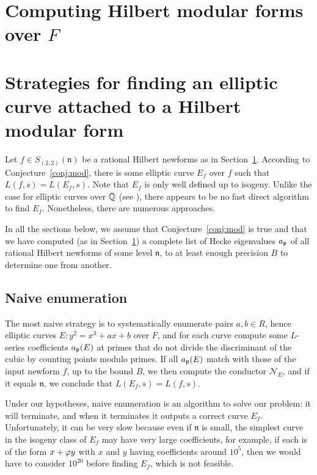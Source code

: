 \documentclass{article}
\newcommand{\n}{\mathfrak{n}}
\newcommand{\cN}{\mathcal{N}}
\begin{document}
\section{Computing Hilbert modular forms over $F$}\label{sec:hmf}



\section{Strategies for finding an elliptic curve attached to a Hilbert modular form}
Let $f\in S_{(2,2)}(\n)$ be a rational Hilbert newforms as in
Section~\ref{sec:hmf}.  According to Conjecture~\ref{conj:mod}, there
is some elliptic curve $E_f$ over $f$ such that $L(f,s) = L(E_f,s)$.
Note that $E_f$ is only well defined up to isogeny.  Unlike the case
for elliptic curves over $\mathbb{Q}$ (see \cite{cremona:algs}), there appears
to be no fast direct algorithm to find $E_f$.  Nonetheless, there are
numerous approaches.

In all the sections below, we assume that Conjecture~\ref{conj:mod} is
true and that we have computed (as in Section~\ref{sec:hmf}) a
complete list of Hecke eigenvalues $a_{\mathfrak{p}}$ of all rational Hilbert
newforms of some level $\n$, to at least enough precision $B$ to determine
one from another.

\subsection{Naive enumeration}\label{sec:naive}

The most naive strategy is to systematically enumerate pairs $a,b\in
R$, hence elliptic curves $E: y^2 = x^3 + ax + b$ over $F$, and for
each curve compute some $L$-series coefficients $a_{\mathfrak{p}}(E)$ at primes
that do not divide the discriminant of the cubic by counting points
modulo primes.  If all $a_{\mathfrak{p}}(E)$ match with those of the input newform
$f$, up to the bound $B$, we then compute the conductor $\cN_E$, and
if it equals $\n$, we conclude that $L(E_f,s) = L(f,s)$.

Under our hypotheses, naive enumeration is an algorithm to solve our
problem: it will terminate, and when it terminates it outputs a
correct curve $E_f$. Unfortunately, it can be very slow because even
if $\n$ is small, the simplest curve in the isogeny class of $E_f$ may
have very large coefficients, for example, if each is of the form
$x+\varphi y$ with $x$ and $y$ having coefficients around $10^5$, then
we would have to consider $10^{20}$ before finding $E_f$, which is not
feasible.
\end{document}
